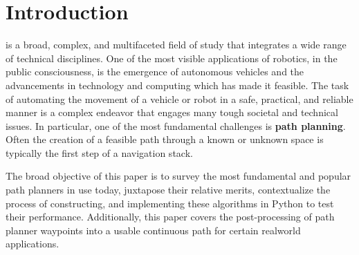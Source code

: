 \section{Introduction}

 is a broad, complex, and multifaceted field of study that integrates a wide range of technical disciplines. One of the most visible applications of robotics, in the public consciousness, is the emergence of autonomous vehicles and the advancements in technology and computing which has made it feasible. The task of automating the movement of a vehicle or robot in a safe, practical, and reliable manner is a complex endeavor that engages many tough societal and technical issues. In particular, one of the most fundamental challenges is \textbf{path planning}. Often the creation of a feasible path through a known or unknown space is typically the first step of a navigation stack.

The broad objective of this paper is to survey the most fundamental and popular path planners in use today, juxtapose their relative merits, contextualize the process of constructing, and implementing these algorithms in Python to test their performance. Additionally, this paper covers the post-processing of path planner waypoints into a usable continuous path for certain realworld applications.   

